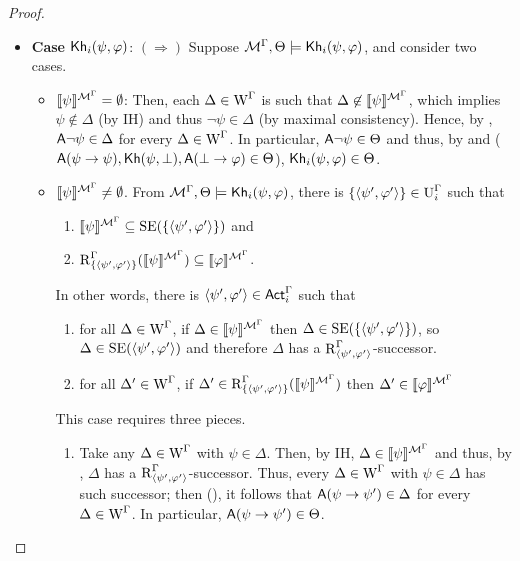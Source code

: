 \begin{proof}
\begin{itemize}
\item \textbf{Case ${\sf Kh}_i(\psi,\varphi)$}: $(\Rightarrow)$ Suppose $\mathcal{M}^\Gamma, \Theta \models {\sf Kh}_i(\psi,\varphi)$, and consider two cases.
\begin{itemize}
\item ${\llbracket \psi \rrbracket^{\mathcal{M}^\Gamma} = \emptyset}$: Then, each $\Delta \in \operatorname{W}^\Gamma$ is such that $\Delta \not\in \llbracket \psi \rrbracket^{\mathcal{M}^\Gamma}$, which implies $\psi \not\in \Delta$ (by IH) and thus $\lnot\psi \in \Delta$ (by maximal consistency).
Hence, by , ${\sf A}\lnot\psi \in \Delta$ for every $\Delta \in \operatorname{W}^\Gamma$. In particular, ${\sf A}\lnot\psi \in \Theta$ and thus, by  and  (${\sf A}(\psi \rightarrow \psi),{\sf Kh}(\psi,\bot),{\sf A}(\bot \rightarrow \varphi) \in \Theta$), ${\sf Kh}_i(\psi, \varphi) \in \Theta$.
\item ${\llbracket \psi \rrbracket^{\mathcal{M}^\Gamma} \neq \emptyset}$.
From $\mathcal{M}^\Gamma, \Theta \models {\sf Kh}_i(\psi,\varphi)$, there is $\{ \langle \psi',\varphi' \rangle \} \in \operatorname{U}^\Gamma_i$ such that
\begin{enumerate}
\item $\llbracket \psi \rrbracket^{\mathcal{M}^\Gamma} \subseteq \operatorname{SE}(\{ \langle \psi',\varphi' \rangle \})$ and
\item $\operatorname{R}^\Gamma_{\{ \langle \psi',\varphi' \rangle \}}(\llbracket \psi \rrbracket^{\mathcal{M}^\Gamma}) \subseteq \llbracket \varphi \rrbracket^{\mathcal{M}^\Gamma}$.
\end{enumerate}
In other words, there is $\langle \psi',\varphi' \rangle \in {\rm \sf Act}^\Gamma_i$ such that
\begin{enumerate}
    \item\label{tlm:cm-esmiv-stexec-lkhi-itm:i} for all $\Delta \in \operatorname{W}^\Gamma$, if $\Delta \in \llbracket \psi \rrbracket^{\mathcal{M}^\Gamma}$ then $\Delta \in \operatorname{SE}(\{ \langle \psi',\varphi' \rangle \})$, so $\Delta \in \operatorname{SE}(\langle \psi',\varphi' \rangle)$ and therefore $\Delta$ has a $\operatorname{R}^\Gamma_{\langle \psi',\varphi' \rangle}$-successor.
    \item\label{tlm:cm-esmiv-stexec-lkhi-itm:ii} for all $\Delta' \in \operatorname{W}^\Gamma$, if $\Delta' \in \operatorname{R}^\Gamma_{\{ \langle \psi',\varphi' \rangle \}}(\llbracket \psi \rrbracket^{\mathcal{M}^\Gamma})$ then $\Delta' \in \llbracket \varphi \rrbracket^{\mathcal{M}^\Gamma}$
\end{enumerate}
This case requires three pieces.
\begin{enumerate}
    \item Take any $\Delta \in \operatorname{W}^\Gamma$ with $\psi \in \Delta$. Then, by IH, $\Delta \in \llbracket \psi \rrbracket^{\mathcal{M}^\Gamma}$ and thus, by , $\Delta$ has a $\operatorname{R}^\Gamma_{\langle \psi',\varphi' \rangle}$-successor.
    Thus, every $\Delta \in \operatorname{W}^\Gamma$ with $\psi \in \Delta$ has such successor; then (), it follows that ${\sf A}(\psi \rightarrow \psi') \in \Delta$ for every $\Delta \in \operatorname{W}^\Gamma$.
    In particular, ${\sf A}(\psi \rightarrow \psi') \in \Theta$.


\end{enumerate}
\end{itemize}
\end{itemize}
\end{proof}

